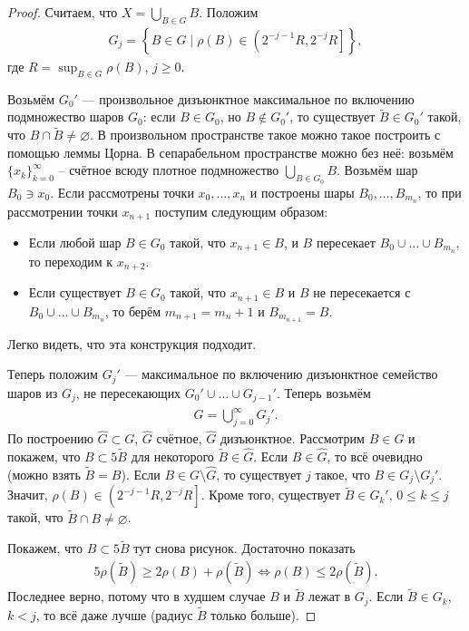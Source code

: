 \begin{proof}
 Считаем, что $X = \bigcup_{B \in G} B $. Положим 
\begin{align*}
G_j = \left\{ B \in G \mid \rho(B) \in \left(2^{-j-1}R, 2^{-j}R\right] \right\}
,\end{align*} где $R = \sup_{B \in G} \rho(B)$, $j \geqslant 0$.

Возьмём $G_0'$ --- произвольное дизъюнктное максимальное по включению подмножество шаров $G_0$: если $B \in G_0$, но $B \notin G_0'$, то существует $\tilde B \in G_0'$ такой, что $B \cap \tilde B \neq \varnothing$. В произвольном пространстве такое можно такое построить с помощью леммы Цорна. В сепарабельном пространстве можно без неё: возьмём $\{x_{k}\}_{k=0}^{\infty} $ -- счётное всюду плотное подмножество $\bigcup_{B \in G_0} B$. Возьмём шар $B_0 \ni x_0$. Если рассмотрены точки $x_0, \ldots, x_n$ и построены шары $B_0, \ldots, B_{m_n}$, то при рассмотрении точки $x_{n+1}$ поступим следующим образом:
 \begin{itemize}
  \item Если любой шар $B \in G_0$ такой, что $x_{n+1} \in B$, и $B$ пересекает $B_0 \cup \ldots \cup B_{m_n}$, то переходим к $x_{n+2}$.
  \item Если существует $B \in G_0$ такой, что $x_{n+1} \in B$ и $B$ не  пересекается с $B_0 \cup \ldots \cup B_{m_n}$, то берём $m_{n+1} = m_n + 1$ и  $B_{m_{n+1}} = B$.
\end{itemize} Легко видеть, что эта конструкция подходит.

Теперь положим $G_j'$ --- максимальное по включению дизъюнктное семейство шаров из $G_j$, не пересекающих $G_0' \cup \ldots \cup G_{j-1}'$. Теперь возьмём 
\begin{align*}
\hat G = \bigcup_{j=0}^{\infty} G_j'
.\end{align*} По построению  $\hat G \subset G$, $\hat G$ счётное, $\hat G$ дизъюнктное. Рассмотрим $B \in G$  и покажем, что $B \subset 5\tilde B$ для некоторого $\tilde B \in \hat G$. Если $B \in \hat G$, то всё очевидно (можно взять $\tilde B = B$). Если $B \in G \setminus \hat G$, то существует $j$ такое, что $B \in G_j \setminus G_j'$. Значит, $\rho(B) \in \left(2^{-j-1}R, 2^{-j}R\right]$. Кроме того, существует $\tilde B \in G_k'$, $0 \leqslant k \leqslant j$ такой, что $\tilde B \cap B \neq \varnothing$.

Покажем, что $B \subset 5\tilde B$ {\color{red} тут снова рисунок}. Достаточно показать \begin{align*}
 5\rho(\tilde B) \geqslant 2 \rho(B) + \rho(\tilde B) \iff \rho(B) \leqslant 2 \rho(\tilde B)
.\end{align*} Последнее верно, потому что в худшем случае $B$ и $\tilde B$ лежат в $G_j$. Если  $\tilde B \in G_k$, $k < j$, то всё даже лучше (радиус $\tilde B$ только больше).
\end{proof}
